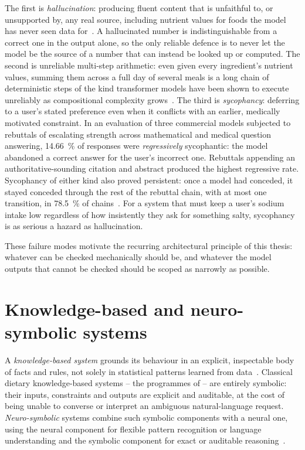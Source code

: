 The first is \emph{hallucination}: producing fluent content that is unfaithful to, or unsupported by, any real source, including nutrient values for foods the model has never seen data for~\cite{ji2023survey}. A hallucinated number is indistinguishable from a correct one in the output alone, so the only reliable defence is to never let the model be the source of a number that can instead be looked up or computed. The second is unreliable multi-step arithmetic: even given every ingredient's nutrient values, summing them across a full day of several meals is a long chain of deterministic steps of the kind transformer models have been shown to execute unreliably as compositional complexity grows~\cite{dziri2023faith}. The third is \emph{sycophancy}: deferring to a user's stated preference even when it conflicts with an earlier, medically motivated constraint. In an evaluation of three commercial models subjected to rebuttals of escalating strength across mathematical and medical question answering, \qty{14.66}{\percent} of responses were \emph{regressively} sycophantic: the model abandoned a correct answer for the user's incorrect one. Rebuttals appending an authoritative-sounding citation and abstract produced the highest regressive rate. Sycophancy of either kind also proved persistent: once a model had conceded, it stayed conceded through the rest of the rebuttal chain, with at most one transition, in \qty{78.5}{\percent} of chains~\cite{fanous2025syceval}. For a system that must keep a user's sodium intake low regardless of how insistently they ask for something salty, sycophancy is as serious a hazard as hallucination.

These failure modes motivate the recurring architectural principle of this thesis: whatever can be checked mechanically should be, and whatever the model outputs that cannot be checked should be scoped as narrowly as possible.

\section{Knowledge-based and neuro-symbolic systems}
\label{sec:background-neuro-symbolic}

A \emph{knowledge-based system} grounds its behaviour in an explicit, inspectable body of facts and rules, not solely in statistical patterns learned from data~\cite{hayesroth1983knowledge}. Classical dietary knowledge-based systems -- the programmes of  -- are entirely symbolic: their inputs, constraints and outputs are explicit and auditable, at the cost of being unable to converse or interpret an ambiguous natural-language request. \emph{Neuro-symbolic} systems combine such symbolic components with a neural one, using the neural component for flexible pattern recognition or language understanding and the symbolic component for exact or auditable reasoning~\cite{garcez2023neurosymbolic}.

